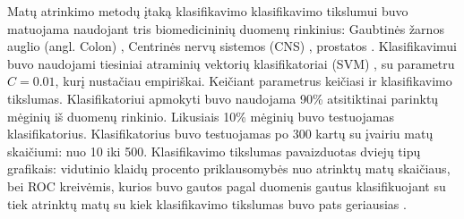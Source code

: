 Matų atrinkimo metodų įtaką klasifikavimo klasifikavimo tikslumui buvo matuojama naudojant tris biomedicininių duomenų rinkinius: Gaubtinės žarnos auglio (angl. Colon) \cite{alon1999broad}, Centrinės nervų sistemos (CNS) \cite{pomeroy2002prediction}, prostatos \cite{singh2002gene}. Klasifikavimui buvo naudojami tiesiniai atraminių vektorių klasifikatoriai (SVM) \cite{vapnik2000nature}, su parametru $C=0.01$, kurį nustačiau  empiriškai. Keičiant parametrus keičiasi ir klasifikavimo tikslumas. Klasifikatoriui apmokyti buvo naudojama 90\% atsitiktinai parinktų mėginių iš duomenų rinkinio. Likusiais 10\% mėginių buvo testuojamas klasifikatorius. Klasifikatorius buvo testuojamas po 300 kartų su įvairiu matų skaičiumi: nuo 10 iki 500. Klasifikavimo tikslumas pavaizduotas dviejų tipų grafikais: vidutinio klaidų procento priklausomybės nuo atrinktų matų skaičiaus, bei ROC kreivėmis, kurios buvo gautos pagal duomenis gautus klasifikuojant su tiek atrinktų matų su kiek klasifikavimo tikslumas buvo pats geriausias \cite{green1966signal}.
